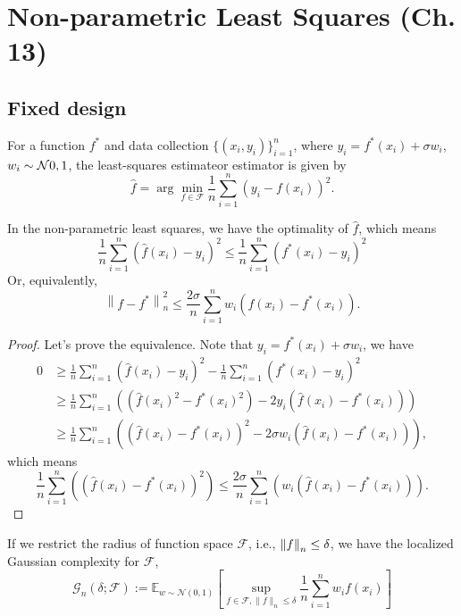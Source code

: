 \section{Non-parametric Least Squares (Ch. 13)}

\subsection{Fixed design}

\begin{definition}
For a function $f^*$ and data collection $\{(x_i, y_i)\}_{i=1}^n$, where $y_i = f^*(x_i) + \sigma w_i$, $w_i \sim \mathcal{N}{0, 1}$, the least-squares estimateor estimator is given by
$$
\hat{f} = \arg \min_{f\in\mathcal{F}} \frac{1}{n} \sum_{i=1}^{n} (y_i - f(x_i))^2.
$$
\end{definition}

\begin{property} In the non-parametric least squares, we have the optimality of $\hat{f}$, which means
$$
\frac{1}{n} \sum_{i=1}^{n}\left(\hat{f}\left(x_{i}\right)-y_{i}\right)^{2} \leq \frac{1}{n} \sum_{i=1}^{n}\left(f^{*}\left(x_{i}\right) - y_{i}\right)^{2}
$$
Or, equivalently,
$$
\left\|f-f^{*}\right\|_{n}^{2} \leq \frac{2 \sigma}{n} \sum_{i=1}^{n} w_{i}\left(f\left(x_{i}\right)-f^{*}\left(x_{i}\right)\right).
$$
\end{property}
\begin{proof}
Let's prove the equivalence. Note that $y_i = f^*(x_i) + \sigma w_i$, we have 
\begin{align*}
    0 & \geq \frac{1}{n} \sum_{i=1}^{n}\left(\hat{f}\left(x_{i}\right)-y_{i}\right)^{2} - \frac{1}{n} \sum_{i=1}^{n}\left(f^{*}\left(x_{i}\right) - y_{i}\right)^{2} \\
    & \geq \frac{1}{n} \sum_{i=1}^{n} \left( (\hat{f}(x_i)^2 - f^*(x_i)^2) - 2y_i (\hat{f}(x_i) - f^*(x_i)) \right) \\
    & \geq \frac{1}{n} \sum_{i=1}^{n} \left( (\hat{f}(x_i) - f^*(x_i))^2 - 2\sigma w_i (\hat{f}(x_i) - f^*(x_i))\right),
\end{align*}
which means
$$
\frac{1}{n} \sum_{i=1}^{n} \left( (\hat{f}(x_i) - f^*(x_i))^2 \right) \leq \frac{2 \sigma}{n} \sum_{i=1}^{n} \left( w_i (\hat{f}(x_i) - f^*(x_i)) \right).
$$
\end{proof}

\begin{definition} If we restrict the radius of function space $\mathcal{F}$, i.e., $\left\lVert f \right\rVert_n \leq \delta$, we have the localized Gaussian complexity for $\mathcal{F}$,
$$
{\mathcal{G}}_n\left(\delta ; \mathcal{F}\right):=\mathbb{E}_{w \sim \mathcal{N}(0,1)}\left[\sup _{f \in \mathcal{F},\|f\|_{n} \leq \delta} \frac{1}{n} \sum_{i=1}^{n} w_{i} f\left(x_{i}\right)\right]
$$
\end{definition}

